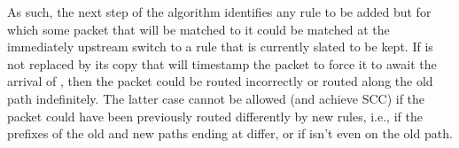 \medskip

\hspace*{-\parindent}


As such, the next step of the algorithm identifies any rule 
to be added but for which some packet that will be matched to it could
be matched at the immediately upstream switch to a rule 
that is currently slated to be kept.  If  is not replaced by
its copy  that will timestamp the packet to force it to
await the arrival of , then the packet could be routed
incorrectly or routed along the old path indefinitely.  The latter
case cannot be allowed (and achieve SCC) if the packet could have been
previously routed differently by new rules, i.e., if the prefixes of
the old and new paths ending at  differ, or if
 isn't even on the old path.







